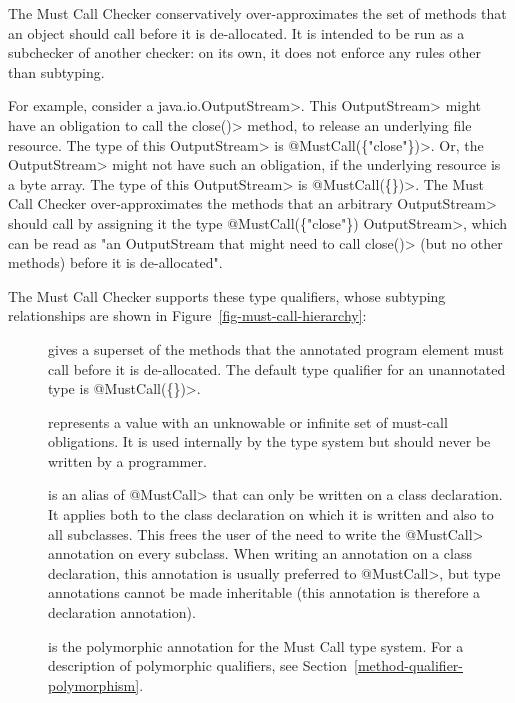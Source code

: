 \htmlhr
{}

The Must Call Checker conservatively over-approximates
the set of methods that an object should call before it is de-allocated.
It is intended to be run as a subchecker of another checker: on its own, it does not
enforce any rules other than subtyping.

For example, consider a \<java.io.OutputStream>.  This \<OutputStream>
might have an obligation to call the \<close()> method, to release an
underlying file resource. The type of this \<OutputStream> is
\<@MustCall(\{"close"\})>.  Or, the \<OutputStream> might not have such an
obligation, if the underlying resource is a byte array. The type of this
\<OutputStream> is \<@MustCall(\{\})>.  The Must Call Checker
over-approximates the methods that an arbitrary \<OutputStream> should call
by assigning it the type \<@MustCall(\{"close"\}) OutputStream>, which can
be read as "an OutputStream that might need to call \<close()> (but no
other methods) before it is de-allocated".


The Must Call Checker supports these type qualifiers, whose subtyping relationships
are shown in Figure~\ref{fig-must-call-hierarchy}:

\begin{description}

\item[]
  gives a superset of the methods that the annotated program element
  must call before it is de-allocated.
  The default type qualifier for an unannotated type is \<@MustCall(\{\})>.

\item[]
  represents a value with an unknowable or infinite set of must-call obligations.
  It is used internally by the type system but should never be written by a
  programmer.

\item[]
  is an alias of \<@MustCall> that can only be written on a class declaration.
  It applies both to the class declaration on which it is written and also to all subclasses.
  This frees the user of the need to write the \<@MustCall> annotation on every subclass.
  When writing an annotation on a class declaration, this annotation is usually preferred
  to \<@MustCall>, but type annotations cannot be made inheritable (this annotation is
  therefore a declaration annotation).

\item[]
  is the polymorphic annotation for the Must Call type system.
  For a description of polymorphic qualifiers, see
  Section~\ref{method-qualifier-polymorphism}.

\end{description}

